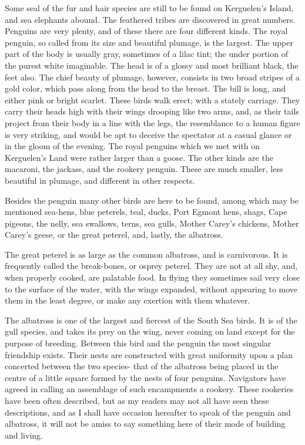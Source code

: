 Some seal of the fur and hair species are still to be found on Kerguelen's
Island, and sea elephants abound. The feathered tribes are discovered in great
numbers. Penguins are very plenty, and of these there are four different kinds.
The royal penguin, so called from its size and beautiful plumage, is the
largest. The upper part of the body is usually gray, sometimes of a lilac tint;
the under portion of the purest white imaginable. The head is of a glossy and
most brilliant black, the feet also. The chief beauty of plumage, however,
consists in two broad stripes of a gold color, which pass along from the head to
the breast. The bill is long, and either pink or bright scarlet. These birds
walk erect; with a stately carriage. They carry their heads high with their
wings drooping like two arms, and, as their tails project from their body in a
line with the legs, the resemblance to a human figure is very striking, and
would be apt to deceive the spectator at a casual glance or in the gloom of the
evening. The royal penguins which we met with on Kerguelen's Land were rather
larger than a goose. The other kinds are the macaroni, the jackass, and the
rookery penguin. These are much smaller, less beautiful in plumage, and
different in other respects. 

Besides the penguin many other birds are here to be found, among which may be
mentioned sea-hens, blue peterels, teal, ducks, Port Egmont hens, shags, Cape
pigeons, the nelly, sea swallows, terns, sea gulls, Mother Carey's chickens,
Mother Carey's geese, or the great peterel, and, lastly, the albatross. 

The great peterel is as large as the common albatross, and is carnivorous. It
is frequently called the break-bones, or osprey peterel. They are not at all
shy, and, when properly cooked, are palatable food. In flying they sometimes
sail very close to the surface of the water, with the wings expanded, without
appearing to move them in the least degree, or make any exertion with them
whatever. 

The albatross is one of the largest and fiercest of the South Sea birds. It
is of the gull species, and takes its prey on the wing, never coming on land
except for the purpose of breeding. Between this bird and the penguin the most
singular friendship exists. Their nests are constructed with great uniformity
upon a plan concerted between the two species- that of the albatross being
placed in the centre of a little square formed by the nests of four penguins.
Navigators have agreed in calling an assemblage of such encampments a rookery.
These rookeries have been often described, but as my readers may not all have
seen these descriptions, and as I shall have occasion hereafter to speak of the
penguin and albatross, it will not be amiss to say something here of their mode
of building and living. 

